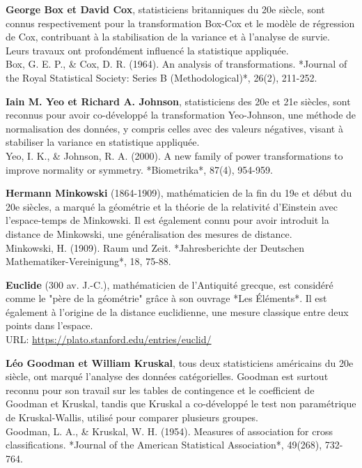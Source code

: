 \adjustmtc
\newpage
\renewcommand\bibname{Biographie}
\begin{thebibliography}{9}
\thispagestyle{MyStyle}
\textbf{George Box et David Cox}, statisticiens britanniques du 20e siècle, sont connus respectivement pour la transformation Box-Cox et le modèle de régression de Cox, contribuant à la stabilisation de la variance et à l'analyse de survie. Leurs travaux ont profondément influencé la statistique appliquée. \\ 
Box, G. E. P., \& Cox, D. R. (1964). An analysis of transformations. *Journal of the Royal Statistical Society: Series B (Methodological)*, 26(2), 211-252.

\textbf{Iain M. Yeo et Richard A. Johnson}, statisticiens des 20e et 21e siècles, sont reconnus pour avoir co-développé la transformation Yeo-Johnson, une méthode de normalisation des données, y compris celles avec des valeurs négatives, visant à stabiliser la variance en statistique appliquée.\\
Yeo, I. K., \& Johnson, R. A. (2000). A new family of power transformations to improve normality or symmetry. *Biometrika*, 87(4), 954-959.

\textbf{Hermann Minkowski} (1864-1909), mathématicien de la fin du 19e et début du 20e siècles, a marqué la géométrie et la théorie de la relativité d'Einstein avec l'espace-temps de Minkowski. Il est également connu pour avoir introduit la distance de Minkowski, une généralisation des mesures de distance.\\
Minkowski, H. (1909). Raum und Zeit. *Jahresberichte der Deutschen Mathematiker-Vereinigung*, 18, 75-88.

\textbf{Euclide} (300 av. J.-C.), mathématicien de l'Antiquité grecque, est considéré comme le "père de la géométrie" grâce à son ouvrage *Les Éléments*. Il est également à l'origine de la distance euclidienne, une mesure classique entre deux points dans l'espace. \\ 
URL: \url{https://plato.stanford.edu/entries/euclid/}

\textbf{Léo Goodman et William Kruskal}, tous deux statisticiens américains du 20e siècle, ont marqué l'analyse des données catégorielles. Goodman est surtout reconnu pour son travail sur les tables de contingence et le coefficient de Goodman et Kruskal, tandis que Kruskal a co-développé le test non paramétrique de Kruskal-Wallis, utilisé pour comparer plusieurs groupes. \\ 
Goodman, L. A., \& Kruskal, W. H. (1954). Measures of association for cross classifications. *Journal of the American Statistical Association*, 49(268), 732-764.


\end{thebibliography}
